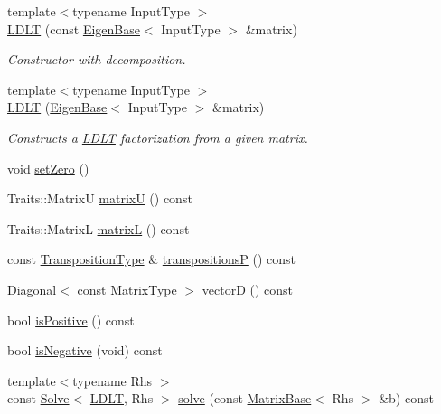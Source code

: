 \begin{DoxyCompactItemize}
{\footnotesize template$<$typename Input\+Type $>$ }\\\hyperlink{group___cholesky___module_ad0e8d2131ea1a626a08d98e9effb1cc5}{L\+D\+LT} (const \hyperlink{group___core___module_struct_eigen_1_1_eigen_base}{Eigen\+Base}$<$ Input\+Type $>$ \&matrix)
\begin{DoxyCompactList}\small\item\em Constructor with decomposition. \end{DoxyCompactList}\item 
{\footnotesize template$<$typename Input\+Type $>$ }\\\hyperlink{group___cholesky___module_adf853d6cbbc49f3535a44439bca344d9}{L\+D\+LT} (\hyperlink{group___core___module_struct_eigen_1_1_eigen_base}{Eigen\+Base}$<$ Input\+Type $>$ \&matrix)
\begin{DoxyCompactList}\small\item\em Constructs a \hyperlink{group___cholesky___module_class_eigen_1_1_l_d_l_t}{L\+D\+LT} factorization from a given matrix. \end{DoxyCompactList}\item 
void \hyperlink{group___cholesky___module_a776d0ab6c980847297d25b03b5d2216a}{set\+Zero} ()
\item 
Traits\+::\+MatrixU \hyperlink{group___cholesky___module_a54838a2e31e53bbe4dcb78b5e80c8484}{matrixU} () const
\item 
Traits\+::\+MatrixL \hyperlink{group___cholesky___module_af0e6a0df5679873b42cf82a372dd8ddb}{matrixL} () const
\item 
const \hyperlink{group___core___module}{Transposition\+Type} \& \hyperlink{group___cholesky___module_a47257d3500f9f7c9a4478158d0e34941}{transpositionsP} () const
\item 
\hyperlink{group___core___module_class_eigen_1_1_diagonal}{Diagonal}$<$ const Matrix\+Type $>$ \hyperlink{group___cholesky___module_af60b2f826a38a00070e0efccf0572066}{vectorD} () const
\item 
bool \hyperlink{group___cholesky___module_a5e1c6b7ba8d7b82575d6ffdc3bf35bcb}{is\+Positive} () const
\item 
bool \hyperlink{group___cholesky___module_aabd3e7aebe844034caca4c62dbe9c1eb}{is\+Negative} (void) const
\item 
{\footnotesize template$<$typename Rhs $>$ }\\const \hyperlink{group___core___module_class_eigen_1_1_solve}{Solve}$<$ \hyperlink{group___cholesky___module_class_eigen_1_1_l_d_l_t}{L\+D\+LT}, Rhs $>$ \hyperlink{group___cholesky___module_aa257dd7a8acf8b347d5a22a13d6ca3e1}{solve} (const \hyperlink{group___core___module_class_eigen_1_1_matrix_base}{Matrix\+Base}$<$ Rhs $>$ \&b) const

\end{DoxyCompactItemize}
